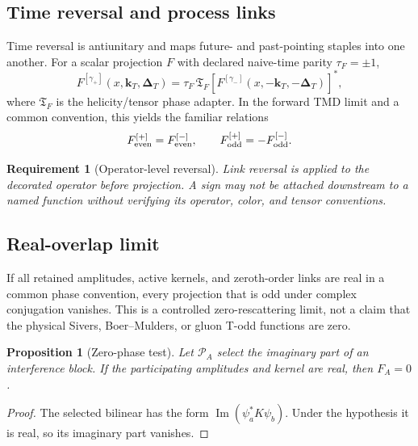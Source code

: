 \documentclass[11pt]{article}
\newtheorem{requirement}[definition]{Requirement}
\newtheorem{proposition}[definition]{Proposition}
\newcommand{\kT}{\bm{k}_{T}}
\newcommand{\DT}{\bm{\Delta}_{T}}
\newcommand{\cP}{\mathcal P}
\begin{document}
\subsection{Time reversal and process links}

Time reversal is antiunitary and maps future- and past-pointing staples into
one another.  For a scalar projection \(F\) with declared naive-time parity
\(\tau_F=\pm1\),
\begin{equation}
 F^{[\gamma_+]}(x,\kT,\DT)
 =\tau_F\,
 \mathfrak T_F
 \left[F^{[\gamma_-]}(x,-\kT,-\DT)\right]^*,
\label{eq:time-reversal-link}
\end{equation}
where \(\mathfrak T_F\) is the helicity/tensor phase adapter.  In the forward
TMD limit and a common convention, this yields the familiar relations
\begin{equation}
 F_{\rm even}^{[+]}=F_{\rm even}^{[-]},
 \qquad
 F_{\rm odd}^{[+]}=-F_{\rm odd}^{[-]}.
\label{eq:tmd-link-reversal}
\end{equation}

\begin{requirement}[Operator-level reversal]
\label{req:operator-level-reversal}
Link reversal is applied to the decorated operator before projection.  A
sign may not be attached downstream to a named function without verifying
its operator, color, and tensor conventions.
\end{requirement}

\subsection{Real-overlap limit}

If all retained amplitudes, active kernels, and zeroth-order links are real in
a common phase convention, every projection that is odd under complex
conjugation vanishes.  This is a controlled zero-rescattering limit, not a
claim that the physical Sivers, Boer--Mulders, or gluon T-odd functions are
zero.

\begin{proposition}[Zero-phase test]
\label{prop:zero-phase-test}
Let \(\cP_A\) select the imaginary part of an interference block.  If the
participating amplitudes and kernel are real, then \(F_A=0\).
\end{proposition}

\begin{proof}
The selected bilinear has the form
\(\operatorname{Im}(\psi_a^*K\psi_b)\).  Under the hypothesis it is real, so
its imaginary part vanishes.
\end{proof}
\end{document}
